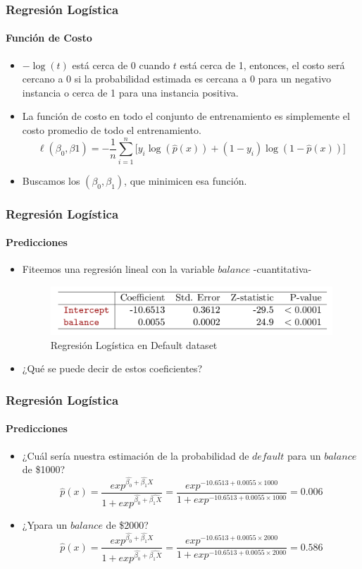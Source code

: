 \documentclass{beamer}
\begin{document}
\begin{frame}
\frametitle{Regresión Logística}
\framesubtitle{Función de Costo}
\begin{itemize}
	\item $-\log(t)$ está cerca de 0 cuando $t$ está cerca de 1, entonces, el costo será cercano a 0 si la probabilidad estimada es cercana a 0 para un negativo instancia o cerca de 1 para una instancia positiva.
	\item La función de costo en todo el conjunto de entrenamiento es simplemente el costo promedio de todo el entrenamiento.
	\begin{equation}
		\ell(\beta_{0}, \beta{1}) = -\frac{1}{n}\sum_{i=1}^n \Big[y_{i} \log(\hat{p}(x))  + (1-y_{i}) \log(1-\hat{p}(x))\Big]
	\end{equation}
	\item Buscamos los $(\beta_{0}, \beta_{1})$, que minimicen esa función.
\end{itemize}
\end{frame}

\begin{frame}
\frametitle{Regresión Logística}
\framesubtitle{Predicciones}
\begin{itemize}
	\item Fiteemos una regresión lineal con la variable $balance$ -cuantitativa-
	\begin{figure}[H]	
		\centering
		\includegraphics[width=0.9\linewidth, height=0.2\textheight]{./img/03}
		\caption{Regresión Logística en Default dataset \cite{hastie02}}
	\end{figure}
	\item ¿Qué se puede decir de estos coeficientes?
\end{itemize}
\end{frame}

\begin{frame}
\frametitle{Regresión Logística}
\framesubtitle{Predicciones}
\begin{itemize}
	\item ¿Cuál sería nuestra estimación de la probabilidad de $default$ para un $balance$ de \$1000?
	\begin{equation}
		\hat{p}(x) = \frac{exp^{\hat{\beta_{0}} + \hat{\beta_{1}}X}}{1 + exp^{\hat{\beta_{0}} + \hat{\beta_{1}X}}} = \frac{exp^{-10.6513+0.0055\times1000}}{1+exp^{-10.6513+0.0055\times1000}} = 0.006
	\end{equation}
	
		\item ¿Ypara un $balance$ de \$2000?
		\begin{equation}
			\hat{p}(x) = \frac{exp^{\hat{\beta_{0}} + \hat{\beta_{1}}X}}{1 + exp^{\hat{\beta_{0}} + \hat{\beta_{1}X}}} = \frac{exp^{-10.6513+0.0055\times2000}}{1+exp^{-10.6513+0.0055\times2000}} = 0.586
	\end{equation}
\end{itemize}
\end{frame}
\end{document}
